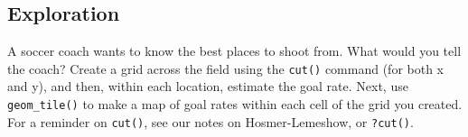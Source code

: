 \documentclass[]{article}
\begin{document}
\hypertarget{exploration}{%
\subsection{Exploration}\label{exploration}}

A soccer coach wants to know the best places to shoot from. What would
you tell the coach? Create a grid across the field using the
\texttt{cut()} command (for both x and y), and then, within each
location, estimate the goal rate. Next, use \texttt{geom\_tile()} to
make a map of goal rates within each cell of the grid you created. For a
reminder on \texttt{cut()}, see our notes on Hosmer-Lemeshow, or
\texttt{?cut()}.
\end{document}
